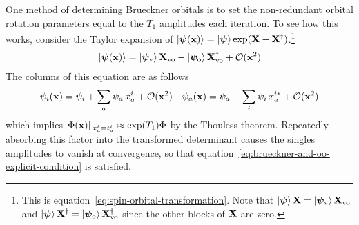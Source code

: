 \documentclass[11pt]{article}
\numberwithin{equation}{section}
\begin{document}
\begin{rmk}
\label{rmk:brueckner-algorithm-explanation}
One method of determining Brueckner orbitals is to set the non-redundant orbital rotation parameters equal to the $T_1$ amplitudes each iteration.
To see how this works, consider the Taylor expansion of
$
  \kt{\bm{\y}(\bo{x})}
=
  \kt{\bm{\y}}\,
  \mr{exp}(\bo{X} - \bo{X}\dg)
$.\footnote{%
  This is equation~\ref{eq:spin-orbital-transformation}.
  Note that
  $
    \kt{\bm{\y}}\,
    \bo{X}
  =
    \kt{\bm{\y}_\mr{v}}\,
    \bo{X}_\mr{vo}
  $
  and
  $
    \kt{\bm{\y}}\,
    \bo{X}\dg
  =
    \kt{\bm{\y}_\mr{o}}\,
    \bo{X}_\mr{vo}\dg
  $
  since the other blocks of $\mathbf{X}$ are zero.
}
\begin{align}
  \kt{\bm{\y}(\bo{x})}
=
  \kt{\bm{\y}_\mr{v}}\,
  \bo{X}_\mr{vo}
-
  \kt{\bm{\y}_\mr{o}}\,
  \bo{X}_\mr{vo}\dg
+
  \mc{O}(\bo{x}^2)
\end{align}
The columns of this equation are as follows
\begin{align}
  \psi _i(\mathbf{x})
=
  \psi _i
+
  \sum_a
  \psi _a\,
  x_a^i
+
  \mathcal{O}(\mathbf{x}^2)
&&
  \psi _a(\mathbf{x})
=
  \psi _a
-
  \sum_i
  \psi _i\,
  x_a^{i*}
+
  \mathcal{O}(\mathbf{x}^2)
\end{align}
which implies
$
\left.
  \Phi (\mathbf{x})
\right|{}_{x_a^i=t_a^i}
\approx
  \mathrm{exp}(T_1)
  \Phi 
$
by the Thouless theorem.
Repeatedly absorbing this factor into the transformed determinant causes the singles amplitudes to vanish at convergence, so that equation~\ref{eq:brueckner-and-oo-explicit-condition} is satisfied.
\end{rmk}
\end{document}
